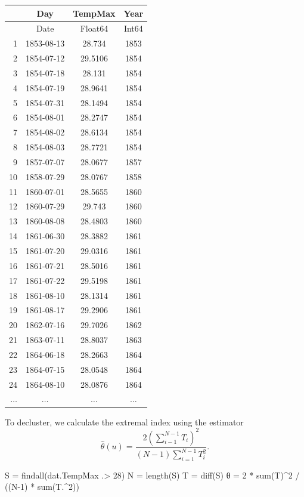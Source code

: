 \documentclass[
  letterpaper,
  DIV=11,
  numbers=noendperiod]{scrartcl}
\newenvironment{Shaded}{\begin{snugshade}}{\end{snugshade}}
\newcommand{\FloatTok}[1]{\textcolor[rgb]{0.68,0.00,0.00}{#1}}
\newcommand{\FunctionTok}[1]{\textcolor[rgb]{0.28,0.35,0.67}{#1}}
\newcommand{\NormalTok}[1]{\textcolor[rgb]{0.00,0.23,0.31}{#1}}
\newcommand{\OperatorTok}[1]{\textcolor[rgb]{0.37,0.37,0.37}{#1}}
\begin{document}
\begin{tabular}{r|ccc}
    & Day & TempMax & Year\\
    \hline
    & Date & Float64 & Int64\\
    \hline
    1 & 1853-08-13 & 28.734 & 1853 \\
    2 & 1854-07-12 & 29.5106 & 1854 \\
    3 & 1854-07-18 & 28.131 & 1854 \\
    4 & 1854-07-19 & 28.9641 & 1854 \\
    5 & 1854-07-31 & 28.1494 & 1854 \\
    6 & 1854-08-01 & 28.2747 & 1854 \\
    7 & 1854-08-02 & 28.6134 & 1854 \\
    8 & 1854-08-03 & 28.7721 & 1854 \\
    9 & 1857-07-07 & 28.0677 & 1857 \\
    10 & 1858-07-29 & 28.0767 & 1858 \\
    11 & 1860-07-01 & 28.5655 & 1860 \\
    12 & 1860-07-29 & 29.743 & 1860 \\
    13 & 1860-08-08 & 28.4803 & 1860 \\
    14 & 1861-06-30 & 28.3882 & 1861 \\
    15 & 1861-07-20 & 29.0316 & 1861 \\
    16 & 1861-07-21 & 28.5016 & 1861 \\
    17 & 1861-07-22 & 29.5198 & 1861 \\
    18 & 1861-08-10 & 28.1314 & 1861 \\
    19 & 1861-08-17 & 29.2906 & 1861 \\
    20 & 1862-07-16 & 29.7026 & 1862 \\
    21 & 1863-07-11 & 28.8037 & 1863 \\
    22 & 1864-06-18 & 28.2663 & 1864 \\
    23 & 1864-07-15 & 28.0548 & 1864 \\
    24 & 1864-08-10 & 28.0876 & 1864 \\
    $\dots$ & $\dots$ & $\dots$ & $\dots$ \\
\end{tabular}

To decluster, we calculate the extremal index using the estimator
\[\hat{\theta}(u) = \frac{2\left(\sum_{i-1}^{N-1} T_i\right)^2}{(N-1)\sum_{i=1}^{N-1}T_i^2}.\]

\begin{Shaded}
\begin{Highlighting}[]
\NormalTok{S }\OperatorTok{=} \FunctionTok{findall}\NormalTok{(dat.TempMax }\OperatorTok{.\textgreater{}} \FloatTok{28}\NormalTok{)}
\NormalTok{N }\OperatorTok{=} \FunctionTok{length}\NormalTok{(S)}
\NormalTok{T }\OperatorTok{=} \FunctionTok{diff}\NormalTok{(S)}
\NormalTok{θ }\OperatorTok{=} \FloatTok{2} \OperatorTok{*} \FunctionTok{sum}\NormalTok{(T)}\OperatorTok{\^{}}\FloatTok{2} \OperatorTok{/}\NormalTok{ ((N}\OperatorTok{{-}}\FloatTok{1}\NormalTok{) }\OperatorTok{*} \FunctionTok{sum}\NormalTok{(T}\OperatorTok{.\^{}}\FloatTok{2}\NormalTok{))}
\end{Highlighting}
\end{Shaded}
\end{document}
